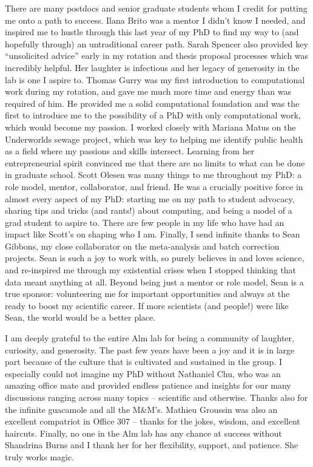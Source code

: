 \begin{singlespace}
There are many postdocs and senior graduate students whom I credit for putting me onto a path to success.
Ilana Brito was a mentor I didn't know I needed, and inspired me to hustle through this last year of my PhD to find my way to (and hopefully through) an untraditional career path.
Sarah Spencer also provided key ``unsolicited advice'' early in my rotation and thesis proposal processes which was incredibly helpful.
Her laughter is infectious and her legacy of generosity in the lab is one I aspire to.
Thomas Gurry was my first introduction to computational work during my rotation, and gave me much more time and energy than was required of him.
He provided me a solid computational foundation and was the first to introduce me to the possibility of a PhD with only computational work, which would become my passion.
I worked closely with Mariana Matus on the Underworlds sewage project, which was key to helping me identify public health as a field where my passions and skills intersect.
Learning from her entrepreneurial spirit convinced me that there are no limits to what can be done in graduate school.
Scott Olesen was many things to me throughout my PhD: a role model, mentor, collaborator, and friend.
He was a crucially positive force in almost every aspect of my PhD: starting me on my path to student advocacy, sharing tips and tricks (and rants!) about computing, and being a model of a grad student to aspire to.
There are few people in my life who have had an impact like Scott's on shaping who I am.
Finally, I send infinite thanks to Sean Gibbons, my close collaborator on the meta-analysis and batch correction projects.
Sean is such a joy to work with, so purely believes in and loves science, and re-inspired me through my existential crises when I stopped thinking that data meant anything at all.
Beyond being just a mentor or role model, Sean is a true sponsor: volunteering me for important opportunities and always at the ready to boost my scientific career.
If more scientists (and people!) were like Sean, the world would be a better place.

I am deeply grateful to the entire Alm lab for being a community of laughter, curiosity, and generosity.
The past few years have been a joy and it is in large part because of the culture that is cultivated and sustained in the group.
I especially could not imagine my PhD without Nathaniel Chu, who was an amazing office mate and provided endless patience and insights for our many discussions ranging across many topics -- scientific and otherwise.
Thanks also for the infinite guacamole and all the M\&M's.
Mathieu Groussin was also an excellent compatriot in Office 307 -- thanks for the jokes, wisdom, and excellent haircuts.
Finally, no one in the Alm lab has any chance at success without Shandrina Burns and I thank her for her flexibility, support, and patience. She truly works magic.


\end{singlespace}
